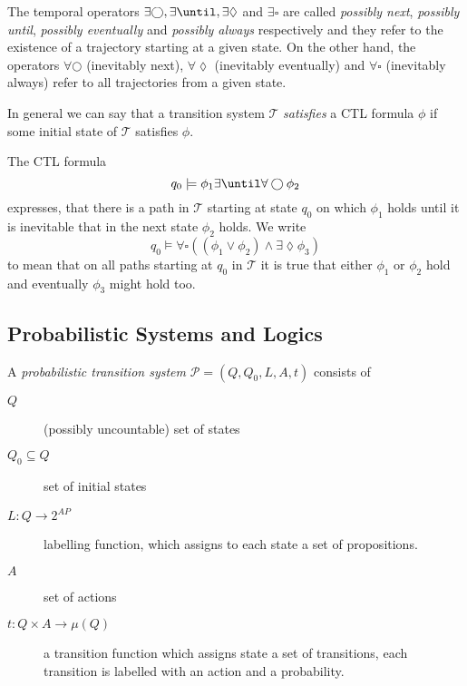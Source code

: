 The temporal operators $\exists\bigcirc, \exists\until, \exists\lozenge$ and $\exists\square$ are called \emph{possibly next}, \emph{possibly until}, \emph{possibly eventually} and \emph{possibly always} respectively and they refer to the existence of a trajectory starting at a given state. On the other hand, the operators $\forall\bigcirc$ (inevitably next), $\forall\lozenge$ (inevitably eventually) and $\forall\square$ (inevitably always) refer to all trajectories from a given state.

In general we can say that a transition system $\mathcal{T}$ \emph{satisfies} a CTL formula $\phi$ if some initial state of $\mathcal{T}$ satisfies $\phi$.

\begin{ex}
The CTL formula
\[
q_{0}\models \phi_{1}\exists\until\forall\bigcirc \phi_{2}
\]
expresses, that there is a path in $\mathcal{T}$ starting at state $q_{0}$ on which $\phi_{1}$ holds until it is inevitable that in the next state $\phi_{2}$ holds.
We write
\[
q_{0}\models\forall\square((\phi_{1}\lor\phi_{2})\land\exists\lozenge\phi_{3})
\]
to mean that on all paths starting at $q_{0}$ in $\mathcal{T}$ it is true that either $\phi_{1}$ or $\phi_{2}$ hold and eventually $\phi_{3}$ might hold too.
\end{ex}

\subsection{Probabilistic Systems and Logics}

\begin{defi}
A \emph{probabilistic transition system} $\mathcal{P}=(Q,Q_{0},L,A,t)$
consists of
\begin{description}
    \item[$Q$] (possibly uncountable) set of states
    \item[$Q_{0}\subseteq Q$] set of initial states
    \item[$L:Q\rightarrow 2^{AP}$] labelling function, which assigns to each state a set of propositions.
    \item[$A$] set of actions
    \item[$t:Q\times A\rightarrow \mu(Q)$] a transition function which assigns state a set of transitions, each transition is labelled with an action and a probability.
\end{description}
\end{defi}



